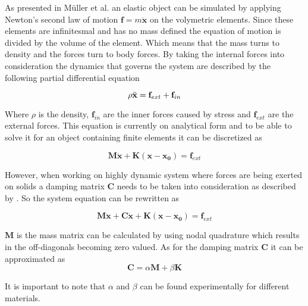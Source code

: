 As presented in M\"uller et al. \cite{rt_phys} an elastic object can be simulated by applying Newton's second law of motion $\mathbf{f} = m\ddot{\mathbf{x}}$ on the volymetric elements. Since these elements are infinitesmal and has no mass defined the equation of motion is divided by the volume of the element. Which means that the mass turns to density and the forces turn to body forces. By taking the internal forces into consideration the dynamics that governs the system are described by the following partial differential equation  

\begin{equation}\label{eqn:contPDE}
    \rho \ddot{\bf x} ={\mathbf f}_{ext} + {\mathbf f}_{in}
\end{equation}

Where $\rho$ is the density, ${\mathbf f}_{in}$ are the inner forces caused by stress and ${\mathbf f}_{ext}$ are the external forces. This equation is currently on analytical form and to be able to solve it for an object containing finite elements it can be discretized as

\begin{equation}\label{eqn:discPDE}
\mathbf{M\ddot{x}} + \mathbf{K(x- x_0)} =  \mathbf{f}_{ext}
\end{equation}

However, when working on highly dynamic system where forces are being exerted on solids a damping matrix $\mathbf{C}$ needs to be taken into consideration as described by \cite{fem_liu}. So the system equation can be rewritten as

\begin{equation}\label{eqn:fullDiscPDE}
\mathbf{M\ddot{x}} + \mathbf{C\dot{x}} + \mathbf{K(x-x_0)} =  \mathbf{f}_{ext}
\end{equation}

$\mathbf{M}$ is the mass matrix can be calculated by using nodal quadrature \cite{hans} which results in the off-diagonals becoming zero valued. As for the damping matrix $\mathbf{C}$ it can be approximated as
\begin{equation}\label{eqn:BuildC}
\mathbf{\mathbf{C}} = \alpha \mathbf{M} + \beta \mathbf{K}
\end{equation}

It is important to note that $\alpha$ and $\beta$ can be found experimentally for different materials.
